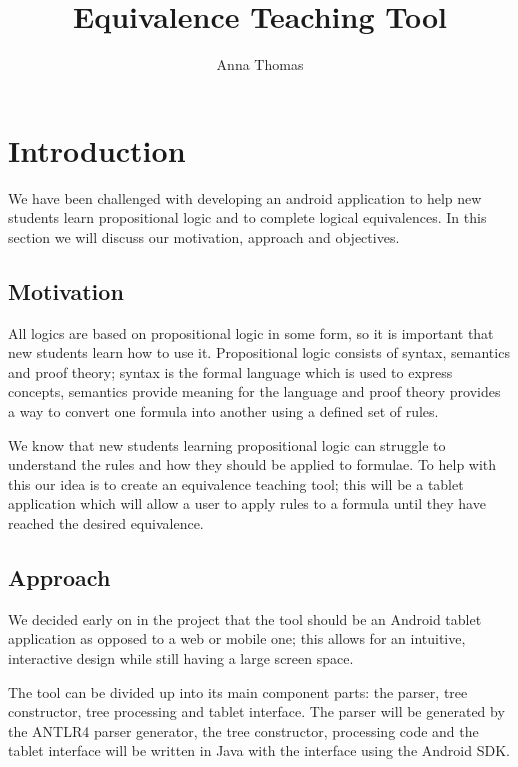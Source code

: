 \documentclass{report}
\begin{document}
 

\title{Equivalence Teaching Tool} 
\author{Anna Thomas} 

\maketitle 

\tableofcontents 

\chapter{Introduction} 


We have been challenged with developing an android application to help new students learn propositional logic and to complete logical equivalences. In this section we will discuss our motivation, approach and objectives.

\section{Motivation} 

All logics are based on propositional logic in some form, so it is important that new students learn how to use it. Propositional logic consists of syntax, semantics and proof theory; syntax is the formal language which is used to express concepts, semantics provide meaning for the language and proof theory provides a way to convert one formula into another using a defined set of rules.

We know that new students learning propositional logic can struggle to understand the rules and how they should be applied to formulae. To help with this our idea is to create an equivalence teaching tool; this will be a tablet application which will allow a user to apply rules to a formula until they have reached the desired equivalence.

\section{Approach}

We decided early on in the project that the tool should be an Android tablet application as opposed to a web or mobile one; this allows for an intuitive, interactive design while still having a large screen space.

The tool can be divided up into its main component parts: the parser, tree constructor, tree processing and tablet interface. The parser will be generated by the ANTLR4 parser generator, the tree constructor, processing code and the tablet interface will be written in Java with the interface using the Android SDK.
\end{document}
